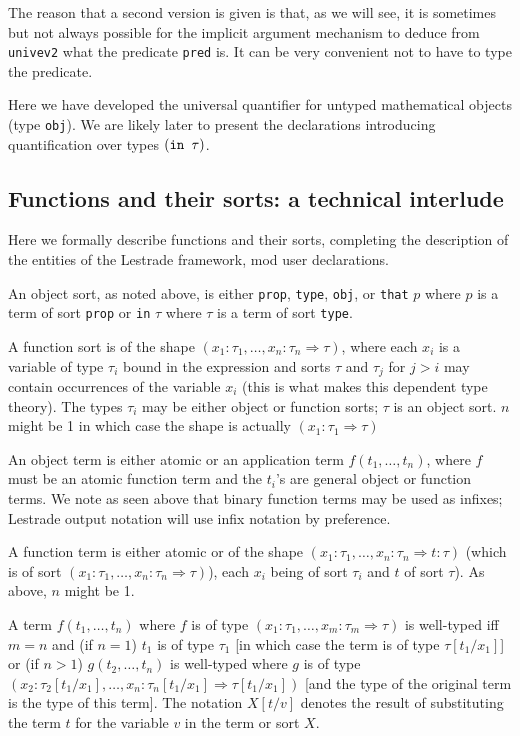 \documentclass[12pt]{article}
\begin{document}
The reason that a second version is given is that, as we will see, it is sometimes but not always possible for the implicit argument mechanism to deduce from {\tt univev2} what the predicate {\tt pred} is.  It can be very convenient not to have to type the predicate.

Here we have developed the universal quantifier for untyped mathematical objects (type {\tt obj}).  We are likely later to present the declarations introducing quantification over types $({\tt in} \verb| | \tau)$.

\newpage

\subsection{Functions and their sorts:  a technical interlude}

Here we formally describe functions and their sorts, completing the description of the entities of the Lestrade framework, mod user declarations.

An object sort, as noted above, is either {\tt prop}, {\tt type}, {\tt obj}, or {\tt that} $p$ where $p$ is a term of sort {\tt prop} or {\tt in} $\tau$ where $\tau$ is a term of sort {\tt type}.

A function sort is of the shape $(x_1:\tau_1,\ldots,x_n:\tau_n\Rightarrow \tau)$, where each $x_i$ is a variable of type $\tau_i$
bound in the expression and sorts $\tau$ and $\tau_j$ for $j>i$ may contain occurrences of the variable $x_i$ (this is what makes this dependent type theory).  The types $\tau_i$ may be either object or function sorts;  $\tau$ is an object sort.  $n$ might be 1 in which case the shape is actually $(x_1:\tau_1\Rightarrow \tau)$

An object term is either atomic or an application term $f(t_1,\ldots,t_n)$, where $f$ must be an atomic function term
and the $t_i$'s are general object or function terms.  We note as seen above that binary function terms may be used as infixes;  Lestrade output notation will use infix notation by preference.

A function term is either atomic or of the shape $(x_1:\tau_1,\ldots,x_n:\tau_n\Rightarrow t:\tau)$ (which is of sort $(x_1:\tau_1,\ldots,x_n:\tau_n\Rightarrow \tau)$), each $x_i$ being of sort $\tau_i$ and $t$ of sort $\tau$).  As above, $n$ might be 1.

A term $f(t_1,\ldots,t_n)$ where $f$ is of type $(x_1:\tau_1,\ldots,x_m:\tau_m\Rightarrow \tau)$ is well-typed iff
$m=n$ and (if $n=1$) $t_1$ is of type $\tau_1$ [in which case the term is of type $\tau[t_1/x_1]$] or (if $n>1$)
$g(t_2,\ldots,t_n)$ is well-typed where $g$ is of type $(x_2:\tau_2[t_1/x_1],\ldots,x_n:\tau_n[t_1/x_1]\Rightarrow \tau[t_1/x_1])$ [and the type of the original term is the type of this term].  The notation $X[t/v]$ denotes the result of substituting the term $t$ for the variable $v$ in the term or sort $X$.
\end{document}

